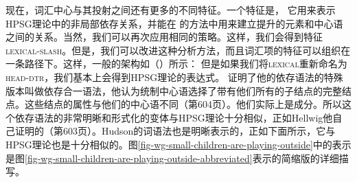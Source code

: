 %
现在，词汇中心与其投射之间还有更多的不同特征。一个特征是\slaschc， 它用来表示HPSG理论中的非局部依存关系，并能在 \citet{GO2009a}的方法中用来建立提升的元素和中心语之间的关系。当然，我们可以再次应用相同的策略。这样，我们会得到特征\textsc{lexical-slash}。但是，我们可以改进这种分析方法，而且词汇项的特征可以组织在一条路径下。这样，一般的架构如（）所示：
\ea
{}
\z
但是如果我们将\textsc{lexical}重新命名为\textsc{head-dtr}，我们基本上会得到HPSG理论的表达式。
%
 \citet[]{Hellwig2003a}证明了他的依存语法的特殊版本叫做依存合一语法，他认为统制中心语选择了带有他们所有的子结点的完整结点。这些结点的属性与他们的中心语不同（第604页）。他们实际上是成分。所以这个依存语法的非常明晰和形式化的变体与HPSG理论十分相似，正如Hellwig他自己证明的（第603页）。Hudson的词语法也是明晰表示的，正如下面所示，它与HPSG理论也是十分相似的。图\vref{fig-wg-small-children-are-playing-outside}中的表示是图\vref{fig-wg-small-children-are-playing-outside-abbreviated}表示的简缩版的详细描写。
%
